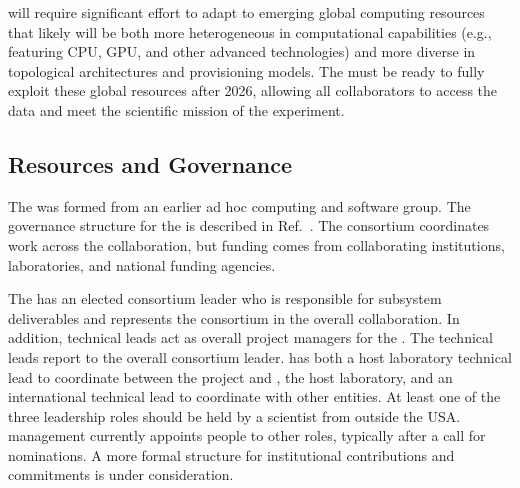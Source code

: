  will require significant effort to adapt to emerging  %
global computing resources that %
  likely will be both more heterogeneous in computational capabilities (e.g., featuring CPU, GPU, and other advanced technologies) and more diverse in topological architectures and provisioning models.  The   must %
be ready to fully exploit these global resources %
after 2026, allowing all collaborators to access the data and meet the scientific mission of the experiment.  

\subsection{Resources and Governance}
\label{sec:exec-comp-res}

The  was formed from an earlier ad hoc  computing and software group. %
The governance structure for the  is described in Ref.~\cite{bib:docdb12751}.  The consortium coordinates work across the collaboration, but funding comes from collaborating institutions, laboratories, and national funding agencies. %

The %
 has an elected consortium leader %
who is responsible for subsystem deliverables and represents the consortium in the overall  collaboration.
In addition, technical leads act as overall project managers for the . The technical leads report to the overall consortium leader.
 has both a host laboratory technical lead to coordinate between the  project and , the host laboratory, 
and an international technical lead to coordinate with other entities.
At least one of the three leadership roles should be held by a scientist from outside the USA. 
 management currently 
appoints people to other roles, typically after a call for nominations.  A more formal structure for institutional contributions and commitments is under consideration. 

